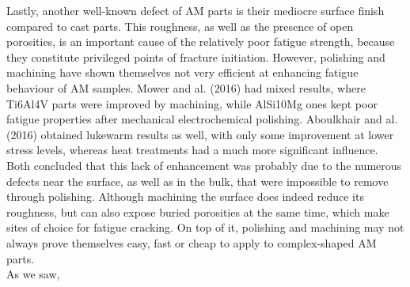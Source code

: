 Lastly, another well-known defect of AM parts is their mediocre surface finish compared to cast parts. This roughness, as well as the presence of open porosities, is an important cause of the relatively poor fatigue strength, because they constitute privileged points of fracture initiation. However, polishing and machining have shown themselves not very efficient at enhancing fatigue behaviour of AM samples. Mower and al. (2016)\cite{MOWER2016198} had mixed results, where Ti6Al4V parts were improved by machining, while AlSi10Mg ones kept poor fatigue properties after mechanical electrochemical polishing. Aboulkhair and al. (2016) \cite{ABOULKHAIR2016bis} obtained lukewarm results as well, with only some improvement at lower stress levels, whereas heat treatments had a much more significant influence. Both concluded that this lack of enhancement was probably due to the numerous defects near the surface, as well as in the bulk, that were impossible to remove through polishing. Although machining the surface does indeed reduce its roughness, but can also expose buried porosities at the same time, which make sites of choice for fatigue cracking. On top of it, polishing and machining may not always prove themselves easy, fast or cheap to apply to complex-shaped AM parts.\\

As we saw, 

